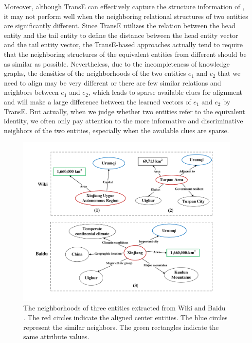 	Moreover, although TransE can effectively capture the structure information of \KGs, it may not perform well when the neighboring relational structures of two entities are significantly different. Since TransE utilizes the relation between the head entity and the tail entity to define the distance between the head entity vector and the tail entity vector, the TransE-based approaches actually tend to require that the neighboring structures of the equivalent entities from different \KGs should be as similar as possible. Nevertheless, due to the incompleteness of knowledge graphs, the densities of the neighborhoods of the two entities $e_1$ and $e_2$ that we need to align may be very different or there are few similar relations and neighbors between $e_1$ and $e_2$, which leads to sparse available clues for alignment and will make a large difference between the learned vectors of $e_1$ and $e_2$ by TransE. But actually, when we judge whether two entities refer to the equivalent identity, we often only pay attention to the more informative and discriminative neighbors of the two entities, especially when the available clues are sparse.
	\begin{figure}
		\begin{center}
			\includegraphics[width=1\linewidth]{figures/graph1.pdf}
			\caption{The neighborhoods of three entities extracted from Wiki and Baidu \KGs. The red circles indicate the aligned center entities. The blue circles represent the similar neighbors. The green rectangles indicate the same attribute values.}
			\label{Xinjiang}
		\end{center}
	\end{figure}
